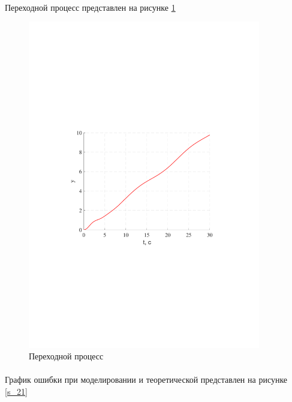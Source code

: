 \documentclass[a4paper,12pt]{article}
\begin{document}
	\paragraph {}Переходной процесс представлен на рисунке \ref{s_20}
	
	\begin{figure}[h]
		\renewcommand{\figurename}{Рисунок}
		\centering
		\includegraphics[width=4in]{ph4MOD.pdf}
		\caption{Переходной процесс}
		\label{s_20}
	\end{figure}
	\newpage
	\paragraph {}График ошибки при моделировании и теоретической представлен на рисунке \ref{s_21}
	
\end{document}
